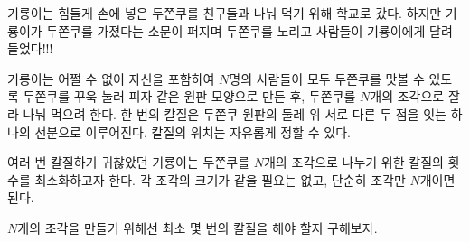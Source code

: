 기룡이는 힘들게 손에 넣은 두쫀쿠를 친구들과 나눠 먹기 위해 학교로 갔다. 
하지만 기룡이가 두쫀쿠를 가졌다는 소문이 퍼지며 두쫀쿠를 노리고 사람들이 기룡이에게 달려들었다!!!

기룡이는 어쩔 수 없이 자신을 포함하여 $N$명의 사람들이 모두 두쫀쿠를 맛볼 수 있도록 두쫀쿠를 꾸욱 눌러 피자 같은 원판 모양으로 만든 후, 
두쫀쿠를 $N$개의 조각으로 잘라 나눠 먹으려 한다. 
한 번의 칼질은 두쫀쿠 원판의 둘레 위 서로 다른 두 점을 잇는 하나의 선분으로 이루어진다. 칼질의 위치는 자유롭게 정할 수 있다.

여러 번 칼질하기 귀찮았던 기룡이는 두쫀쿠를 $N$개의 조각으로 나누기 위한 칼질의 횟수를 최소화하고자 한다. 각 조각의 크기가 같을 필요는 없고, 단순히 조각만 $N$개이면 된다.

$N$개의 조각을 만들기 위해선 최소 몇 번의 칼질을 해야 할지 구해보자.